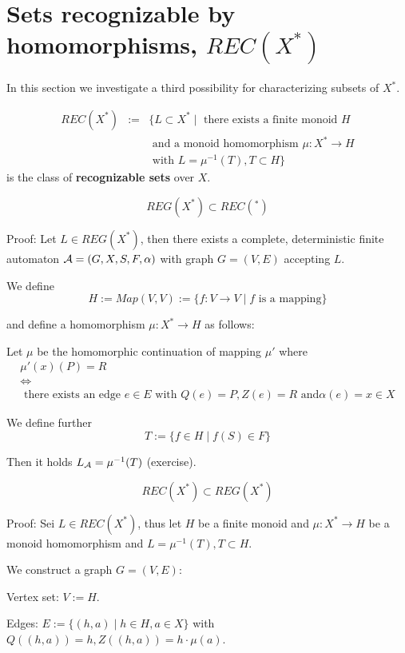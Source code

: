 \section{Sets recognizable by homomorphisms, $REC(X^*)$}

In this section we investigate a third possibility for characterizing subsets of
$X^*$.

\begin{definition}
\begin{eqnarray*}
 REC(X^*) & := & \{ L \subset X^* \mid \mbox{ there exists a
finite monoid } H \\
& & \mbox{ and a monoid homomorphism }\mu : X^* \to H \\
& & \mbox{ with } L = \mu^{-1}(T), T \subset H \}
\end{eqnarray*}
is the class of {\bf recognizable sets} over $X$.
\end{definition}

\begin{lemma}
\[ REG(X^*) \subset REC(^*) \]
\end{lemma}

Proof: Let $L \in REG(X^*)$, then there exists a complete, deterministic finite
automaton $\mbox{$\mathcal{A}$} = (G, X, S, F, \alpha)$ with graph $G = (V, E)$ accepting $L$.

We define \[ H := Map(V,V) := \{ f : V \to V \mid f \mbox{ is a mapping} \} \]

and define a homomorphism $\mu : X^* \to H$ as follows:

Let $\mu$ be the homomorphic continuation of mapping $\mu'$ where
\begin{eqnarray*}
& \mu'(x)(P) = R & \\
& \Leftrightarrow & \\
& \mbox{ there exists an edge }e \in E\mbox{ with }Q(e) = P, Z(e) = R\mbox{ and
}\alpha(e) = x \in X &
\end{eqnarray*}

We define further \[ T := \{ f \in H \mid f(S) \in F \} \]

Then it holds $\mbox{$L_{\mathcal{A}}$} = \mu^{-1}(T)$ (exercise).

\begin{lemma}
\[ REC(X^*) \subset REG(X^*) \]
\end{lemma}

Proof: Sei $L \in REC(X^*)$, thus let $H$ be a finite monoid and $\mu : X^* \to
H$ be a monoid homomorphism and $L = \mu^{-1}(T), T \subset H$.

We construct a graph $G = (V, E)$:

Vertex set: $V := H$.

Edges: $E := \{ (h, a) \mid h \in H, a \in X \}$ with $Q((h,a)) = h, Z((h,a))
= h \cdot \mu(a)$.



























